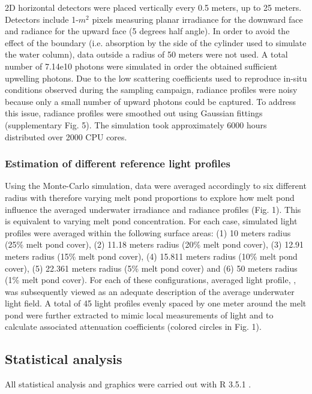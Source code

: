 2D horizontal detectors were placed vertically every 0.5 meters, up to 25 meters. Detectors include 1-$m^2$ pixels measuring planar irradiance for the downward face and radiance for the upward face (5 degrees half angle). In order to avoid the effect of the boundary (i.e. absorption by the side of the cylinder used to simulate the water column), data outside a radius of 50 meters were not used. A total number of 7.14e10 photons were simulated in order the obtained sufficient upwelling photons. Due to the low scattering coefficients used to reproduce in-situ conditions observed during the sampling campaign, radiance profiles were noisy because only a small number of upward photons could be captured. To address this issue, radiance profiles were smoothed out using Gaussian fittings (supplementary Fig. 5).  The simulation took approximately 6000 hours distributed over 2000 CPU cores. 

\subsubsection{Estimation of different reference light profiles}

Using the Monte-Carlo simulation, data were averaged accordingly to six different radius with therefore varying melt pond proportions to explore how melt pond influence the averaged underwater irradiance and radiance profiles (Fig. 1). This is equivalent to varying melt pond concentration. For each case, simulated light profiles were averaged within the following surface areas: (1) 10 meters radius (25\% melt pond cover), (2) 11.18 meters radius (20\% melt pond cover), (3) 12.91 meters radius (15\% melt pond cover), (4) 15.811 meters radius (10\% melt pond cover), (5) 22.361 meters radius (5\% melt pond cover) and (6) 50 meters radius (1\% melt pond cover). For each of these configurations, averaged light profile, \meanedz{}, was subsequently viewed as an adequate description of the average underwater light field. A total of 45 light profiles evenly spaced by one meter around the melt pond were further extracted to mimic local measurements of light and to calculate associated attenuation coefficients (colored circles in Fig. 1).

\subsection{Statistical analysis}

All statistical analysis and graphics were carried out with R 3.5.1 \citep{RCoreTeam2018}.